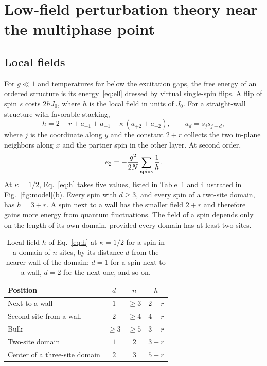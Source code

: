 \documentclass[
 aps,prb,
 twocolumn,
 superscriptaddress,
 longbibliography,
 nofootinbib,
 floatfix
]{revtex4-2}
\begin{document}
\section{Low-field perturbation theory near the multiphase point}
\label{sec:pt}

\subsection{Local fields}

For $g\ll1$ and temperatures far below the excitation gaps, the free energy of an ordered structure
is its energy~\eqref{eq:e0} dressed by virtual single-spin flips. A flip of spin $s$ costs
$2h J_0$, where $h$ is the local field in units of $J_0$. For a straight-wall structure with
favorable stacking,
\begin{equation}
h=2+r+a_{+1}+a_{-1}-\kappa\,(a_{+2}+a_{-2}),\qquad a_{d}=s_js_{j+d},
\label{eq:h}
\end{equation}
where $j$ is the coordinate along $y$ and the constant $2+r$ collects the two in-plane neighbors
along $x$ and the partner spin in the other layer. At second order,
\begin{equation}
e_2=-\frac{g^2}{2N}\sum_{\rm spins}\frac1h .
\label{eq:e2}
\end{equation}
At $\kappa=1/2$, Eq.~\eqref{eq:h} takes five values, listed in Table~\ref{tab:h} and illustrated in
Fig.~\ref{fig:model}(b). Every spin with $d\ge3$, and every spin of a two-site domain, has $h=3+r$. A spin next to a wall has the
smaller field $2+r$ and therefore gains more energy from quantum fluctuations. The field of a spin
depends only on the length of its own domain, provided every domain has at least two sites.

\begin{table}
\caption{Local field $h$ of Eq.~\eqref{eq:h} at $\kappa=1/2$ for a spin in a domain of $n$ sites, by its
distance $d$ from the nearer wall of the domain: $d=1$ for a spin next to a wall, $d=2$ for the next one, and so on.}
\label{tab:h}
\begin{ruledtabular}
\begin{tabular}{lccc}
Position & $d$ & $n$ & $h$ \\
\hline
Next to a wall & $1$ & $\ge3$ & $2+r$ \\
Second site from a wall & $2$ & $\ge4$ & $4+r$ \\
Bulk & $\ge3$ & $\ge5$ & $3+r$ \\
Two-site domain & $1$ & $2$ & $3+r$ \\
Center of a three-site domain & $2$ & $3$ & $5+r$ \\
\end{tabular}
\end{ruledtabular}
\end{table}
\end{document}
